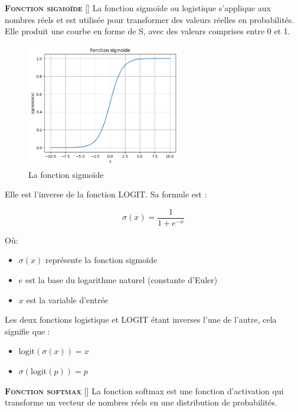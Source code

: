 \documentclass[10pt,french]{report}
\newcommand{\entreelex}[3][]{%
	{\large \textbf{\textsc{#2}}} %
	\if\relax\detokenize{#1}\relax %
	\else %
	\raisebox{0.15ex}{\scalebox{0.7}{$\Diamond$}} %
	[#1] %
	\fi
	\raisebox{0.13ex}{\scalebox{0.75}{$\blacksquare$}} #3 %
}
\begin{document}
	 \label{fonction sigmoïde}
	 \entreelex{Fonction sigmoïde}{La fonction sigmoïde ou logistique s'applique aux nombres réels et est utilisée pour transformer des valeurs réelles en probabilités. Elle produit une courbe en forme de S, avec des valeurs comprises entre 0 et 1.
	 
	 \begin{figure}[h]
	 	\centering
	 	\includegraphics[width=0.6\textwidth]{f_sigmoide.png}
	 	\caption{La fonction sigmoïde}
	 	\label{fig:mesh1}
	 \end{figure}
	 
	 Elle est l'inverse de la fonction LOGIT. Sa formule est :
 	
 	\begin{equation}
 		\sigma(x) = \frac{1}{1 + e^{-x}}
 	\end{equation}
 	
 	Où:
 	\begin{itemize}
 		\item $\sigma(x)$ représente la fonction sigmoïde
 		\item $e$ est la base du logarithme naturel (constante d'Euler)
 		\item $x$ est la variable d'entrée
 	\end{itemize}
 	
 	Les deux fonctions logistique et LOGIT étant inverses l'une de l'autre, cela signifie que :
 	\begin{itemize}
 		\item $\text{logit}(\sigma(x)) = x$
 		\item $\sigma(\text{logit}(p)) = p$
	 \end{itemize}}
	 
	 \label{fonction softmax}
	 \entreelex{Fonction softmax}{La fonction softmax est une fonction d'activation qui transforme un vecteur de nombres réels en une distribution de probabilités.}
	 
\end{document}
